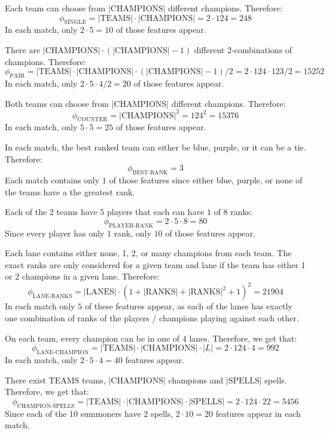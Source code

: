 Each team can choose from $|\text{CHAMPIONS}|$ different champions. Therefore:
\[\phi_{\text{SINGLE}} = |\text{TEAMS}| \cdot |\text{CHAMPIONS}| = 2 \cdot 124 = 248\] 
In each match, only $2 \cdot 5 = 10$ of those features appear.

There are $|\text{CHAMPIONS}| \cdot (|\text{CHAMPIONS}|-1)$ different 2-combinations of champions. Therefore:
\[\phi_{\text{PAIR}} = |\text{TEAMS}| \cdot |\text{CHAMPIONS}| \cdot (|\text{CHAMPIONS}|-1) / 2 = 2 \cdot 124 \cdot 123 / 2 = 15252\] 
In each match, only $2 \cdot 5 \cdot 4 / 2 = 20$ of those features appear.

Both teams can choose from $|\text{CHAMPIONS}|$ different champions. Therefore:
\[\phi_{\text{COUNTER}} = |\text{CHAMPIONS}|^2 = 124^2 = 15376\] 
In each match, only $5 \cdot 5 = 25$ of those features appear.

In each match, the best ranked team can either be blue, purple, or it can be a tie. Therefore:
\[\phi_{\text{BEST-RANK}} = 3\] 
Each match contains only $1$ of those features since either blue, purple, or none of the teams have a the greatest rank.

Each of the $2$ teams have $5$ players that each can have $1$ of $8$ ranks:
\[\phi_{\text{PLAYER-RANK}} = 2 \cdot 5 \cdot 8 = 80\] 
Since every player has only $1$ rank, only $10$ of those features appear.

Each lane contains either none, 1, 2, or many champions from each team. The exact ranks are only considered for a given team and lane if the team has either 1 or 2 champions in a given lane. Therefore:
\[\phi_{\text{LANE-RANKS}} = |\text{LANES}| \cdot (1 + |\text{RANKS}| + |\text{RANKS}|^2 + 1)^2 = 21904\]
In each match only $5$ of these features appear, as each of the lanes has exactly one combination of ranks of the players / champions playing against each other.

On each team, every champion can be in one of 4 lanes. Therefore, we get that:
\[\phi_{\text{LANE-CHAMPION}} = |\text{TEAMS}| \cdot |\text{CHAMPIONS}| \cdot |L| = 2 \cdot 124 \cdot 4 = 992\]
In each match, only $2 \cdot 5 \cdot 4 = 40$ features appear.

There exist $\text{TEAMS}$ teams, $|\text{CHAMPIONS}|$ champions and $|\text{SPELLS}|$ spells. Therefore, we get that:
\[\phi_{\text{CHAMPION-SPELLS}} = |\text{TEAMS}| \cdot |\text{CHAMPIONS}| \cdot |\text{SPELLS}| = 2 \cdot 124 \cdot 22 = 5456\]
Since each of the 10 summoners have 2 spells, $2 \cdot 10 = 20$ features appear in each match.

